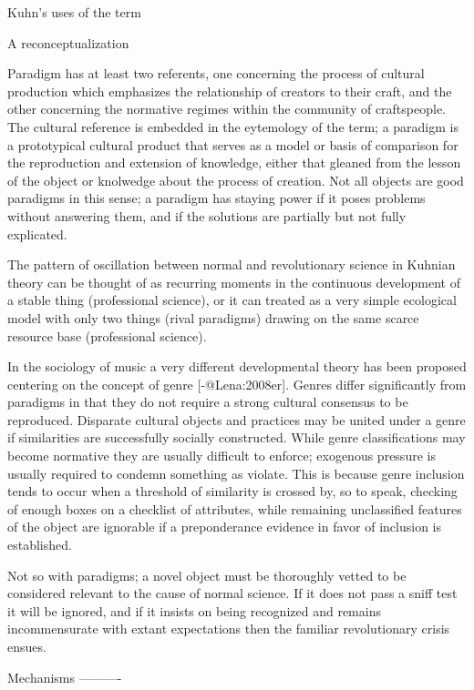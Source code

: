 Kuhn's uses of the term
~~~~~~~~~~~~~~~~~~~~~~~

A reconceptualization
~~~~~~~~~~~~~~~~~~~~~

Paradigm has at least two referents, one concerning the process of
cultural production which emphasizes the relationship of creators to
their craft, and the other concerning the normative regimes within the
community of craftspeople. The cultural reference is embedded in the
eytemology of the term; a paradigm is a prototypical cultural product
that serves as a model or basis of comparison for the reproduction and
extension of knowledge, either that gleaned from the lesson of the
object or knolwedge about the process of creation. Not all objects are
good paradigms in this sense; a paradigm has staying power if it poses
problems without answering them, and if the solutions are partially but
not fully explicated.

The pattern of oscillation between normal and revolutionary science in
Kuhnian theory can be thought of as recurring moments in the continuous
development of a stable thing (professional science), or it can treated
as a very simple ecological model with only two things (rival paradigms)
drawing on the same scarce resource base (professional science).

In the sociology of music a very different developmental theory has been
proposed centering on the concept of genre [-@Lena:2008er]. Genres
differ significantly from paradigms in that they do not require a strong
cultural consensus to be reproduced. Disparate cultural objects and
practices may be united under a genre if similarities are successfully
socially constructed. While genre classifications may become normative
they are usually difficult to enforce; exogenous pressure is usually
required to condemn something as violate. This is because genre
inclusion tends to occur when a threshold of similarity is crossed by,
so to speak, checking of enough boxes on a checklist of attributes,
while remaining unclassified features of the object are ignorable if a
preponderance evidence in favor of inclusion is established.

Not so with paradigms; a novel object must be thoroughly vetted to be
considered relevant to the cause of normal science. If it does not pass
a sniff test it will be ignored, and if it insists on being recognized
and remains incommensurate with extant expectations then the familiar
revolutionary crisis ensues.

Mechanisms
----------

